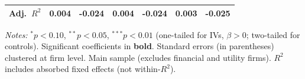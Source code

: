 \begin{landscape}
\begin{table}[H]
\begin{tabular}{lcccccc}
Adj.~$R^2$ & 0.004 & -0.024 & 0.004 & -0.024 & 0.003 & -0.025 \\
\bottomrule
\end{tabular}
\begin{minipage}{\linewidth}
\vspace{2pt}\scriptsize
\textit{Notes:} $^{*}p<0.10$, $^{**}p<0.05$, $^{***}p<0.01$ (one-tailed for IVs, $\beta > 0$; two-tailed for controls).
 Significant coefficients in \textbf{bold}.
 Standard errors (in parentheses) clustered at firm level.
 Main sample (excludes financial and utility firms).
 $R^2$ includes absorbed fixed effects (not within-$R^2$).
\end{minipage}
\end{table}
\end{landscape}